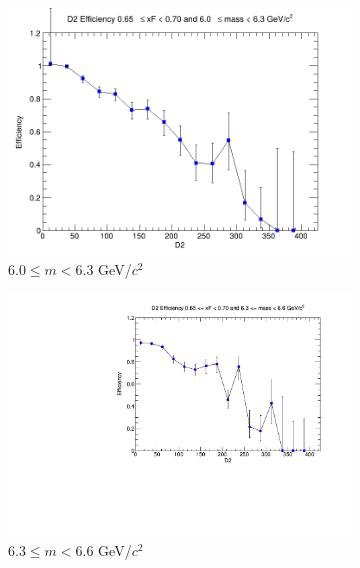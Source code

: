 \begin{figure}[p]
\begin{subfigure}[b]{0.32\textwidth}
        \includegraphics[width=\textwidth]{./kTrackerEfficiencyPlots/D2_Efficiency_xF13_mass6.png}
        \caption{$6.0 \leq m < 6.3$ GeV/$c^2$}
        \label{fig:xF13_mass6}
    \end{subfigure}
    \hfill
    \begin{subfigure}[b]{0.32\textwidth}
        \centering
        \includegraphics[width=\textwidth]{./kTrackerEfficiencyPlots/D2_Efficiency_xF13_mass7.pdf}
        \caption{$6.3 \leq m < 6.6$ GeV/$c^2$}
        \label{fig:xF13_mass7}
    \end{subfigure}
    \hfill
    \begin{subfigure}[b]{0.32\textwidth}
        \centering

\end{subfigure}
\end{figure}
